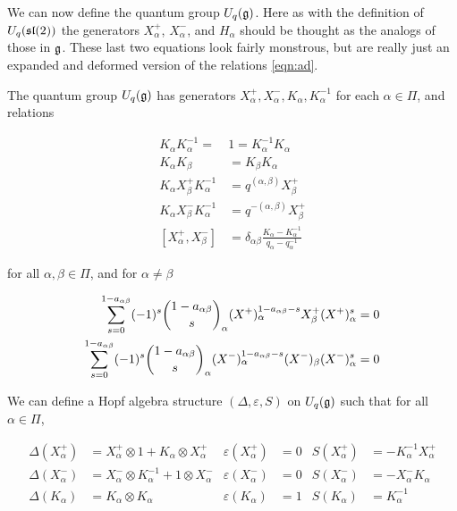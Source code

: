         We can now define the quantum group $U_q(\mathfrak{g})$. Here as with the
        definition of $U_q(\mathfrak{sl}(2))$ the generators $X^+_\alpha$, $X^-_\alpha$,
        and $H_\alpha$ should be thought as the analogs of those in $\mathfrak{g}$.
        These last two equations look fairly monstrous, but are really just an
        expanded and deformed version of the relations \ref{eqn:ad}.
    \begin{defn}
    \label{UqgDef}
        The quantum group $U_q(\mathfrak{g})$ has generators
        $ X^+ _\alpha, X^-_\alpha, K_\alpha, K_\alpha^{-1}$ for each $\alpha \in
        \Pi$, and relations

        \begin{align}
            K_\alpha K_\alpha^{-1} =\ &1  = K_\alpha^{-1}K_\alpha \\
            K_\alpha K_\beta &= K_\beta K_\alpha \\
            K_\alpha  X^+ _\beta K_\alpha^{-1} &= q^{(\alpha, \beta)}  X^+ _\beta \\
            K_\alpha X^-_\beta K_\alpha^{-1} &= q^{-(\alpha, \beta)}  X^+ _\beta \\
            [ X^+ _\alpha, X^-_\beta] &= \delta_{\alpha\beta} \frac{K_\alpha - K_\alpha^{-1}}{ q_\alpha - q_\alpha^{-1}} 
        \end{align}

        for all $\alpha, \beta \in \Pi$, and for $\alpha \neq \beta$

        \begin{align}
            \sum_{s=0}^{1-a_{\alpha\beta}} (-1)^s \dbinom{1-a_{\alpha\beta}}{s}_\alpha  (X^+)_\alpha^{1-a_{\alpha\beta} - s}  X^+_\beta  (X^+)_\alpha^s  &= 0 \\
            \sum_{s=0}^{1-a_{\alpha\beta}} (-1)^s \dbinom{1-a_{\alpha\beta}}{s}_\alpha (X^-)_\alpha^{1-a_{\alpha\beta} - s} (X^-)_\beta (X^-)_\alpha^s  &= 0 
        \end{align}

    \end{defn}

We can define a Hopf algebra structure $(\Delta, \varepsilon, S)$ on
$U_q(\mathfrak{g})$ such that for all $\alpha \in \Pi$,

    \begin{align}
        \Delta(X^+ _\alpha) &=  X^+ _\alpha \otimes 1 + K_\alpha \otimes  X^+ _\alpha      & \varepsilon(X^+ _\alpha) &= 0  & S(X^+ _\alpha) &= -K_\alpha^{-1}  X^+ _\alpha \\
        \Delta(X^-_\alpha) &= X^-_\alpha \otimes K_\alpha^{-1} + 1 \otimes X^-_\alpha & \varepsilon(X^-_\alpha) &= 0  & S(X^-_\alpha) &= -X^-_\alpha K_\alpha \\
        \Delta(K_\alpha) &= K_\alpha \otimes K_\alpha                           & \varepsilon(K_\alpha) &= 1  & S(K_\alpha) &= K_\alpha^{-1}
    \end{align}


